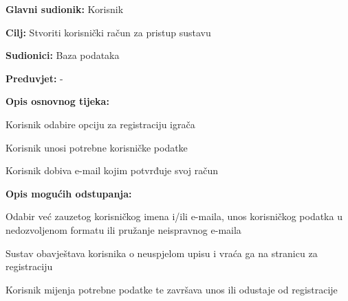 				
					\noindent {}
					\begin{packed_item}
	
						\item \textbf{Glavni sudionik: }Korisnik
						\item  \textbf{Cilj:} Stvoriti korisnički račun za pristup sustavu
						\item  \textbf{Sudionici:} Baza podataka
						\item  \textbf{Preduvjet:} -
						\item  \textbf{Opis osnovnog tijeka:}
						
						\item[] \begin{packed_enum}
	
							\item Korisnik odabire opciju za registraciju igrača
							\item Korisnik unosi potrebne korisničke podatke
							\item Korisnik dobiva e-mail kojim potvrđuje svoj račun

						\end{packed_enum}
						
						\item  \textbf{Opis mogućih odstupanja:}
						
						\item[] \begin{packed_item}
	
							\item[2.a] Odabir već zauzetog korisničkog imena i/ili e-maila, unos korisničkog podatka u nedozvoljenom formatu ili pružanje neispravnog e-maila
							\item[] \begin{packed_enum}
								
								\item Sustav obavještava korisnika o neuspjelom upisu i vraća ga na stranicu za registraciju
								\item Korisnik mijenja potrebne podatke te završava unos ili odustaje od registracije
								
							\end{packed_enum}
							
						\end{packed_item}
					\end{packed_item}
					
